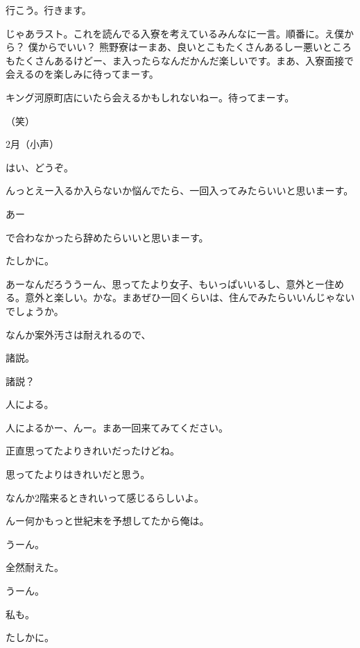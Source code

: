 \begin{multicols}{3}
{        行こう。行きます。

        じゃあラスト。これを読んでる入寮を考えているみんなに一言。順番に。え僕から？ 僕からでいい？ 熊野寮はーまあ、良いとこもたくさんあるしー悪いところもたくさんあるけどー、ま入ったらなんだかんだ楽しいです。まあ、入寮面接で会えるのを楽しみに待ってまーす。

        キング河原町店にいたら会えるかもしれないねー。待ってまーす。

        （笑）

        2月（小声）

        はい、どうぞ。

        んっとえー入るか入らないか悩んでたら、一回入ってみたらいいと思いまーす。

        あー

        で合わなかったら辞めたらいいと思いまーす。

        たしかに。

        あーなんだろううーん、思ってたより女子、もいっぱいいるし、意外とー住める。意外と楽しい。かな。まあぜひ一回くらいは、住んでみたらいいんじゃないでしょうか。

        なんか案外汚さは耐えれるので、

        諸説。

        諸説？

        人による。

        人によるかー、んー。まあ一回来てみてください。

        正直思ってたよりきれいだったけどね。

        思ってたよりはきれいだと思う。

        なんか2階来るときれいって感じるらしいよ。

        んー何かもっと世紀末を予想してたから俺は。

        うーん。

        全然耐えた。

        うーん。

        私も。

        たしかに。

}
\end{multicols}
